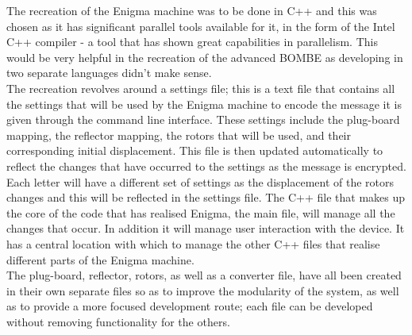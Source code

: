 \documentclass[12pt,a4paper]{article}
\begin{document}
The recreation of the Enigma machine was to be done in C++ and this was chosen as it has significant parallel tools available for it, in the form of the Intel C++ compiler - a tool that has shown great capabilities in parallelism. This would be very helpful in the recreation of the advanced BOMBE as developing in two separate languages didn't make sense.\\

The recreation revolves around a settings file; this is a text file that contains all the settings that will be used by the Enigma machine to encode the message it is given through the command line interface. These settings include the plug-board mapping, the reflector mapping, the rotors that will be used, and their corresponding initial displacement. This file is then updated automatically to reflect the changes that have occurred to the settings as the message is encrypted. Each letter will have a different set of settings as the displacement of the rotors changes and this will be reflected in the settings file. The C++ file that makes up the core of the code that has realised Enigma, the main file, will manage all the changes that occur. In addition it will manage user interaction with the device. It has a central location with which to manage the other C++ files that realise different parts of the Enigma machine.\\

The plug-board, reflector, rotors, as well as a converter file, have all been created in their own separate files so as to improve the modularity of the system, as well as to provide a more focused development route; each file can be developed without removing functionality for the others.\\
\end{document}
